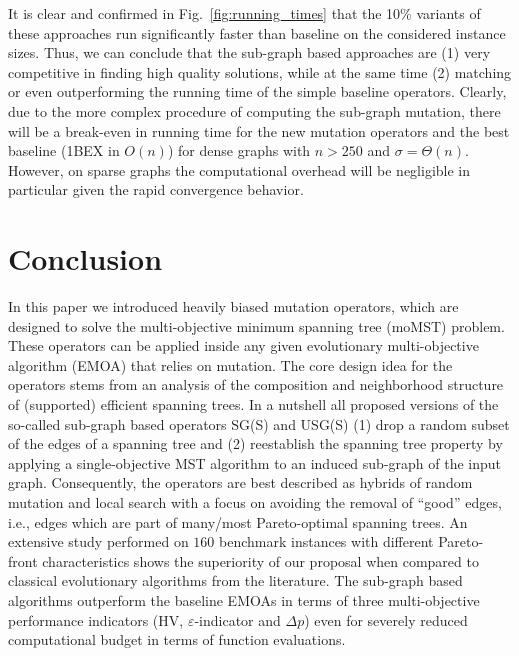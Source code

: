 \documentclass[twoside]{article}
\begin{document}
It is clear and confirmed in Fig.~\ref{fig:running_times} that the 10\% variants of these approaches run significantly faster than baseline on the considered instance sizes. Thus, we can conclude that the sub-graph based approaches are (1) very competitive in finding high quality solutions, while at the same time (2) matching or even outperforming the running time of the simple baseline operators. Clearly, due to the more complex procedure of computing the sub-graph mutation, there will be a break-even in running time for the new mutation operators and the best baseline (1BEX in $O(n)$) for dense graphs with $n > 250$ and $\sigma = \Theta(n)$.
However, on sparse graphs the computational overhead will be negligible in particular given the rapid convergence behavior.



\section{Conclusion}
\label{sec:conclusion}
%

In this paper we introduced heavily biased mutation operators, which are designed to solve the multi-objective minimum spanning tree (moMST) problem. These operators can be applied inside any given evolutionary multi-objective algorithm (EMOA) that relies on mutation. The core design idea for the operators stems from an analysis of the composition and neighborhood structure of (supported) efficient spanning trees. In a nutshell all proposed versions of the so-called sub-graph based operators SG(S) and USG(S) (1) drop a random subset of the edges of a spanning tree and (2) reestablish the spanning tree property by applying a single-objective MST algorithm to an induced sub-graph of the input graph. Consequently, the operators are best described as hybrids of random mutation and local search with a focus on avoiding the removal of \enquote{good} edges, i.e., edges which are part of many/most Pareto-optimal spanning trees.
An extensive study performed on $160$ benchmark instances with different Pareto-front characteristics shows the superiority of our proposal when compared to classical evolutionary algorithms from the literature. The sub-graph based algorithms outperform the baseline EMOAs in terms of three multi-objective performance indicators (HV, $\varepsilon$-indicator and $\Delta p$) even for severely reduced computational budget in terms of function evaluations.
\end{document}
